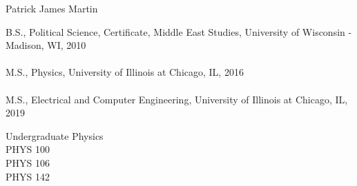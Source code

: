 \vita
\begin{singlespace}
    \begin{description}[labelwidth=4cm,leftmargin=4.2cm,itemsep=1em]

        \item[NAME] Patrick James Martin

        \item[EDUCATION] B.S., Political Science, Certificate, Middle East Studies, University of Wisconsin - Madison, WI, 2010 \\
        \\
        M.S., Physics, University of Illinois at Chicago, IL, 2016\\
        \\
        M.S., Electrical and Computer Engineering, University of Illinois at Chicago, IL, 2019\\

        \item[TEACHING] Undergraduate Physics \\
        PHYS 100\\
        PHYS 106\\
        PHYS 142
        

%
%

    \end{description}
\end{singlespace}
